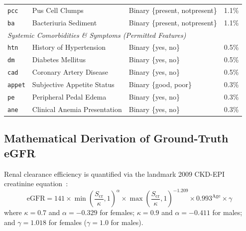 \documentclass[conference]{IEEEtran}
\begin{document}
\begin{table}[htbp]
\begin{tabularx}{\columnwidth}{llp{2.3cm}r}
\texttt{pcc} & Pus Cell Clumps & Binary \{present, notpresent\} & 1.1\% \\
\texttt{ba} & Bacteriuria Sediment & Binary \{present, notpresent\} & 1.1\% \\
\midrule
\multicolumn{4}{l}{\textit{Systemic Comorbidities \& Symptoms (Permitted Features)}} \\
\texttt{htn} & History of Hypertension & Binary \{yes, no\} & 0.5\% \\
\texttt{dm} & Diabetes Mellitus & Binary \{yes, no\} & 0.5\% \\
\texttt{cad} & Coronary Artery Disease & Binary \{yes, no\} & 0.5\% \\
\texttt{appet} & Subjective Appetite Status & Binary \{good, poor\} & 0.3\% \\
\texttt{pe} & Peripheral Pedal Edema & Binary \{yes, no\} & 0.3\% \\
\texttt{ane} & Clinical Anemia Presentation & Binary \{yes, no\} & 0.3\% \\
\bottomrule
\end{tabularx}
\end{table}

\subsection{Mathematical Derivation of Ground-Truth eGFR}
Renal clearance efficiency is quantified via the landmark 2009 CKD-EPI creatinine equation~\cite{levey2009new}:
\begin{equation}
\label{eq:ckdepi}
\text{eGFR} = 141 \times \min\left(\frac{S_{\text{cr}}}{\kappa}, 1\right)^\alpha \times \max\left(\frac{S_{\text{cr}}}{\kappa}, 1\right)^{-1.209} \times 0.993^{\text{Age}} \times \gamma
\end{equation}
where $\kappa = 0.7$ and $\alpha = -0.329$ for females; $\kappa = 0.9$ and $\alpha = -0.411$ for males; and $\gamma = 1.018$ for females ($\gamma = 1.0$ for males).
\end{document}
